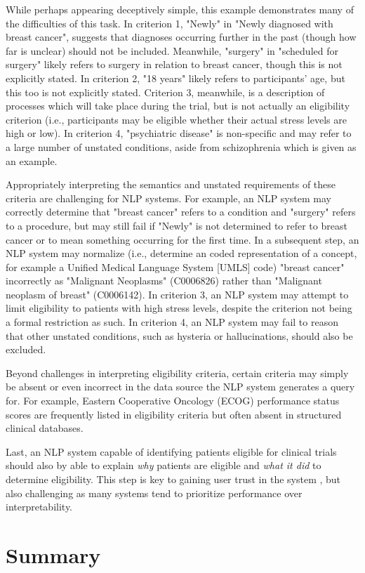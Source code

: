 \documentclass[../main.tex]{subfiles}
\begin{document}
\noindent While perhaps appearing deceptively simple, this example demonstrates many of the difficulties of this task. In criterion 1,  "Newly" in "Newly diagnosed with breast cancer", suggests that diagnoses occurring further in the past (though how far is unclear) should not be included. Meanwhile, "surgery" in "scheduled for surgery" likely refers to surgery in relation to breast cancer, though this is not explicitly stated. In criterion 2, "18 years" likely refers to participants' age, but this too is not explicitly stated. Criterion 3, meanwhile, is a description of processes which will take place during the trial, but is not actually an eligibility criterion (i.e., participants may be eligible whether their actual stress levels are high or low). In criterion 4, "psychiatric disease" is non-specific and may refer to a large number of unstated conditions, aside from schizophrenia which is given as an example.

Appropriately interpreting the semantics and unstated requirements of these criteria are challenging for NLP systems. For example, an NLP system may correctly determine that "breast cancer" refers to a condition and "surgery" refers to a procedure, but may still fail if "Newly" is not determined to refer to breast cancer or to mean something occurring for the first time. In a subsequent step, an NLP system may normalize (i.e., determine an coded representation of a concept, for example a Unified Medical Language System [UMLS] code) "breast cancer" incorrectly as "Malignant Neoplasms" (C0006826) rather than "Malignant neoplasm of breast" (C0006142). In criterion 3, an NLP system may attempt to limit eligibility to patients with high stress levels, despite the criterion not being a formal restriction as such. In criterion 4, an NLP system may fail to reason that other unstated conditions, such as hysteria or hallucinations, should also be excluded.

Beyond challenges in interpreting eligibility criteria, certain criteria may simply be absent or even incorrect in the data source the NLP system generates a query for. For example, Eastern Cooperative Oncology (ECOG) performance status scores \cite{sok2019objective} are frequently listed in eligibility criteria but often absent in structured clinical databases.

Last, an NLP system capable of identifying patients eligible for clinical trials should also by able to explain \textit{why} patients are eligible and \textit{what it did} to determine eligibility. This step is key to gaining user trust in the system \cite{lundberg2018explainable, jermutus2022influences}, but also challenging as many systems tend to prioritize performance over interpretability.

\section{Summary}
\end{document}

